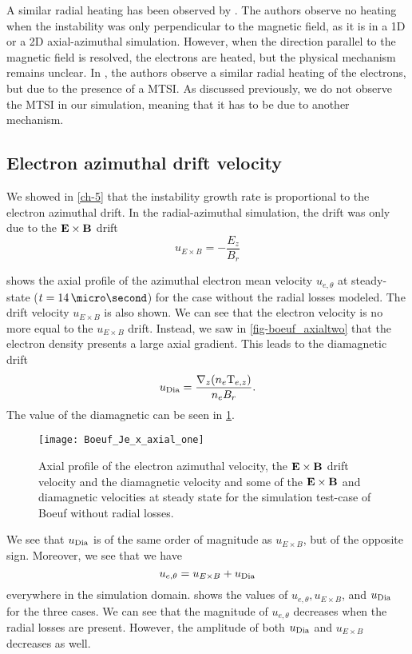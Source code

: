   A similar radial heating has been observed by \citet{heron2013}.
  The authors observe no heating when the instability was only perpendicular to the magnetic field, as it is in a \ac{1D} or a \ac{2D} axial-azimuthal simulation.
  However, when the direction parallel to the magnetic field is resolved, the electrons are heated, but the physical mechanism remains unclear.
  In \citet{janhunen}, the authors observe a similar radial heating of the electrons, but due to the presence of a \ac{MTSI}.
  As discussed previously, we do not observe the \ac{MTSI} in our simulation, meaning that it has to be due to another mechanism.


  \subsection{Electron azimuthal drift velocity} \label{subsec-drift}

  We showed in \cref{ch-5} that the instability growth rate is proportional to the electron azimuthal drift.
  In the radial-azimuthal simulation, the drift was only due to the ${\mathbf E} \times {\mathbf B}$ drift
  \begin{equation} \label{eq-exbdrift}
    u_{E \times B} = - \frac{E_z}{B_r}
  \end{equation}

   shows the axial profile of the azimuthal electron mean velocity $u_{e, \theta}$ at steady-state ($t = 14\,\micro\second$) for the case without the radial losses modeled.
  The drift velocity $u_{E \times B}$ is also shown.
  We can see that the electron velocity is no more equal to the $u_{E \times B}$ drift.
  Instead, we saw in \cref{fig-boeuf_axialtwo} that the electron density presents a large axial gradient.
  This leads to the diamagnetic drift
  $$u_{\rm Dia}=\frac{\nabla_z (n_e {\rm T}_{e,z})}{n_e B_r}.$$
  The value of the diamagnetic can be seen in \cref{fig-Jetheta_sum}.


  \begin{figure}[hbt]
    \centering
    \texttt{[image: Boeuf\_Je\_x\_axial\_one]}
    \caption{Axial profile of the electron azimuthal velocity, the ${\mathbf E} \times {\mathbf B}$ drift velocity and the diamagnetic velocity and some of the ${\mathbf E} \times {\mathbf B}$ and diamagnetic velocities at steady state for the simulation test-case of Boeuf without radial losses.}
    \label{fig-Jetheta_sum}
  \end{figure}


  We see that $u_{\rm Dia}$ is of the same order of magnitude as $u_{E \times B}$, but of the opposite sign.
  Moreover, we see that we have 
  $$ u_{e, \theta} =   u_{E \times B} + u_{\rm Dia}$$
  everywhere in the simulation domain.
   shows the values of $ u_{e, \theta},   u_{E \times B}$, and $u_{\rm Dia}$ for the three cases.
  We can see that the magnitude of $u_{e, \theta} $ decreases when the radial losses are present.
  However, the amplitude of both $u_{\rm Dia}$ and $u_{E \times B}$ decreases as well.

